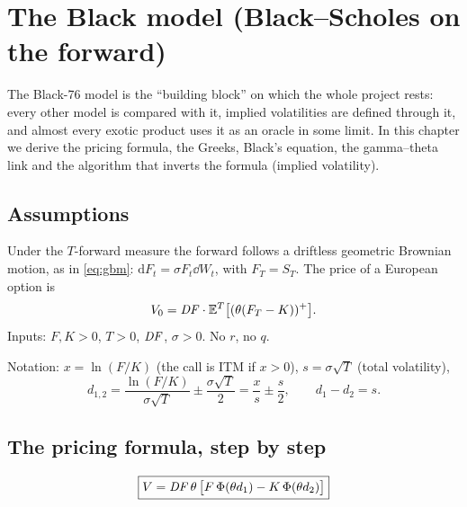 \chapter{The Black model (Black--Scholes on the forward)}
\label{cap:black}

The Black-76 model is the ``building block'' on which the whole project rests: every other model is compared with
it, implied volatilities are defined through it, and almost every exotic product uses it as an oracle in some limit.
In this chapter we derive the pricing formula, the Greeks, Black's equation, the gamma--theta link and the algorithm
that inverts the formula (implied volatility).

\section{Assumptions}
Under the $T$-forward measure the forward follows a driftless geometric Brownian motion, as in \eqref{eq:gbm}:
$\mathrm{d}F_t=\sigma F_t\dd W_t$, with $F_T=S_T$. The price of a European option is
\[
V_0=\mathit{DF}\cdot\mathbb{E}^T\big[(\theta(F_T-K))^+\big].
\]
Inputs: $F,K>0$, $T>0$, $\mathit{DF}$, $\sigma>0$. No $r$, no $q$.

Notation: $x=\ln(F/K)$ (the call is ITM if $x>0$), $s=\sigma\sqrt T$ (total volatility),
\begin{equation}
d_{1,2}=\frac{\ln(F/K)}{\sigma\sqrt T}\pm\frac{\sigma\sqrt T}{2}=\frac{x}{s}\pm\frac{s}{2},\qquad d_1-d_2=s.
\end{equation}

\section{The pricing formula, step by step}
\begin{proposizione}
\begin{equation}\label{eq:black}
\boxed{V=\mathit{DF}\,\theta\,\big[F\,\Phi(\theta d_1)-K\,\Phi(\theta d_2)\big]}
\end{equation}
\end{proposizione}

